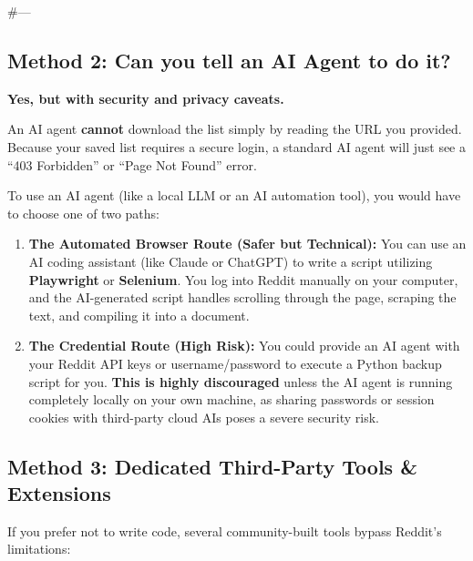 \documentclass[
]{report}
\providecommand{\tightlist}{%
  \setlength{\itemsep}{0pt}\setlength{\parskip}{0pt}}\usepackage{longtable,booktabs,array}
\begin{document}
\#---

\subsection{Method 2: Can you tell an AI Agent to do
it?}\label{method-2-can-you-tell-an-ai-agent-to-do-it}

\textbf{Yes, but with security and privacy caveats.}

An AI agent \textbf{cannot} download the list simply by reading the URL
you provided. Because your saved list requires a secure login, a
standard AI agent will just see a ``403 Forbidden'' or ``Page Not
Found'' error.

To use an AI agent (like a local LLM or an AI automation tool), you
would have to choose one of two paths:

\begin{enumerate}
\def\labelenumi{\arabic{enumi}.}
\tightlist
\item
  \textbf{The Automated Browser Route (Safer but Technical):} You can
  use an AI coding assistant (like Claude or ChatGPT) to write a script
  utilizing \textbf{Playwright} or \textbf{Selenium}. You log into
  Reddit manually on your computer, and the AI-generated script handles
  scrolling through the page, scraping the text, and compiling it into a
  document.
\item
  \textbf{The Credential Route (High Risk):} You could provide an AI
  agent with your Reddit API keys or username/password to execute a
  Python backup script for you. \textbf{This is highly discouraged}
  unless the AI agent is running completely locally on your own machine,
  as sharing passwords or session cookies with third-party cloud AIs
  poses a severe security risk.
\end{enumerate}

\subsection{Method 3: Dedicated Third-Party Tools \&
Extensions}\label{method-3-dedicated-third-party-tools-extensions}

If you prefer not to write code, several community-built tools bypass
Reddit's limitations:
\end{document}
